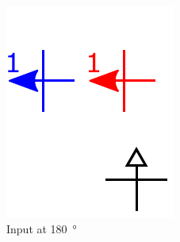 \documentclass[11pt,a4paper,english,twoside]{article}
\newcommand{\rulesep}{\unskip\ \vrule\ }
\begin{document}
\begin{figure}[b!]
\begin{subfigure}[t]{0.23\textwidth}
    \includegraphics[width=\textwidth]{Figures/half_adder/schematic/000006_inputs_In1_0213/Input 180 deg arrowtext.pdf}
    \caption{Input at \SI{180}{\degree}}
\end{subfigure}
\rulesep
\begin{subfigure}[t]{0.23\textwidth}

\end{subfigure}
\end{figure}
\end{document}
